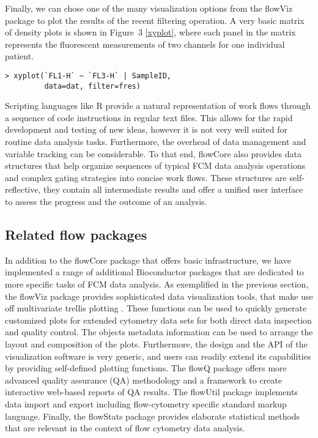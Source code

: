 \documentclass[10pt]{bmc_article}
\newcommand{\Rpackage}[1]{{\textsf{#1}}}
\newenvironment{bmcformat}{\begin{raggedright}\baselineskip20pt\sloppy\setboolean{publ}{false}}{\end{raggedright}\baselineskip20pt\sloppy}
\begin{document}
\begin{bmcformat}
Finally, we can chose one of the many visualization options from the
\Rpackage{flowViz} package to plot the results of the recent filtering
operation. A very basic matrix of density plots is shown in Figure~3
\ref{xyplot}, where each panel in the matrix represents the
fluorescent measurements of two channels for one individual patient.

\begin{verbatim}
> xyplot(`FL1-H` ~ `FL3-H` | SampleID, 
         data=dat, filter=fres)
\end{verbatim}

Scripting languages like R provide a natural representation of work
flows through a sequence of code instructions in regular text
files. This allows for the rapid development and testing of new ideas,
however it is not very well suited for routine data analysis
tasks. Furthermore, the overhead of data management and variable
tracking can be considerable. To that end, \Rpackage{flowCore} also
provides data structures that help organize sequences of typical FCM
data analysis operations and complex gating strategies into concise
work flows. These structures are self-reflective, they contain all
intermediate results and offer a unified user interface to assess the
progress and the outcome of an analysis.

\subsection*{Related flow packages}
In addition to the \Rpackage{flowCore} package that offers basic
infrastructure, we have implemented a range of additional Bioconductor
packages that are dedicated to more specific tasks of FCM data
analysis. As exemplified in the previous section, the
\Rpackage{flowViz} package \cite{sarkar2008ufv} provides sophisticated
data visualization tools, that make use off multivariate trellis
plotting \cite{lattice}.  These functions can be used to quickly
generate customized plots for extended cytometry data sets for both
direct data inspection and quality control.  The objects metadata
information can be used to arrange the layout and composition of the
plots.  Furthermore, the design and the API of the visualization
software is very generic, and users can readily extend its
capabilities by providing self-defined plotting functions.  The
\Rpackage{flowQ} package offers more advanced quality assurance (QA)
methodology and a framework to create interactive web-based reports of
QA results. The \Rpackage{flowUtil} package implements data import and
export including flow-cytometry specific standard markup
language. Finally, the \Rpackage{flowStats} package provides elaborate
statistical methods that are relevant in the context of flow cytometry
data analysis.


\end{bmcformat}
\end{document}
